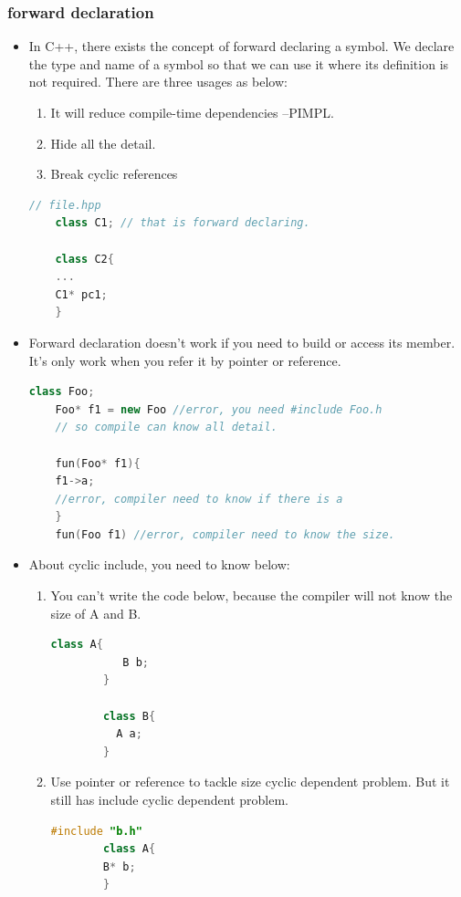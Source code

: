 \documentclass[a4paper,12pt,twoside]{book}
\begin{document}
\subsubsection{forward declaration}

\begin{itemize}
    \item In C++, there exists the concept of forward declaring a symbol. We declare the type and name of a symbol so that we can use it where its definition is not required. There are three usages as below:
    \begin{enumerate}
        \item It will reduce compile-time dependencies --PIMPL.
        \item Hide all the detail. 
        \item Break cyclic references
    \end{enumerate}
    
    \begin{lstlisting}[frame=single, language=c++]
    // file.hpp
    class C1; // that is forward declaring.
    
    class C2{
    ...
    C1* pc1;
    }
    \end{lstlisting}
    
    \item Forward declaration doesn't work if you need to build or access its member. It's only work when you refer it by pointer or reference.
    
    \begin{lstlisting}[frame=single, language=c++]
    class Foo;
    Foo* f1 = new Foo //error, you need #include Foo.h
    // so compile can know all detail.
    
    fun(Foo* f1){
    f1->a; 
    //error, compiler need to know if there is a 
    }
    fun(Foo f1) //error, compiler need to know the size.
    \end{lstlisting}
    
    \item About cyclic include, you need to know below:
    \begin{enumerate}
        \item You can't write the code below, because the compiler will not know the size of A and B. 
        \begin{lstlisting}[frame=single, language=c++]
        class A{
           B b;
        }
        
        class B{
          A a;
        }
        \end{lstlisting}
        \item Use pointer or reference to tackle size cyclic dependent problem. But it still has include cyclic dependent problem. 
        \begin{lstlisting}[frame=single, language=c++]
        #include "b.h"
        class A{
        B* b;
        }
        

\end{lstlisting}
\end{enumerate}
\end{itemize}
\end{document}

